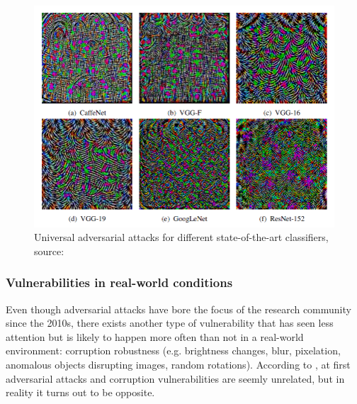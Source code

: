 \vspace{0.2cm}

\begin{figure}[H]
	\centering
	\includegraphics[scale=0.85]{images/adversarial_attacks/Adv_Fig_002_UAE.PNG}
	\caption{Universal adversarial attacks for different state-of-the-art classifiers, source: \cite{moosavidezfooli2016universal}}
	\label{fig:Adv_002_Fig}
\end{figure}

\vspace{0.2cm}


\subsubsection{Vulnerabilities in real-world conditions}

Even though adversarial attacks have bore the focus of the research community since the 2010s, there exists another type of vulnerability that has seen less attention but is likely to happen more often than not in a real-world environment: corruption robustness (e.g. brightness changes, blur, pixelation, anomalous objects disrupting images, random rotations). According to \cite{ford2019adversarial}, at first adversarial attacks and corruption vulnerabilities are seemly unrelated, but in reality it turns out to be opposite.

\vspace{0.2cm}


